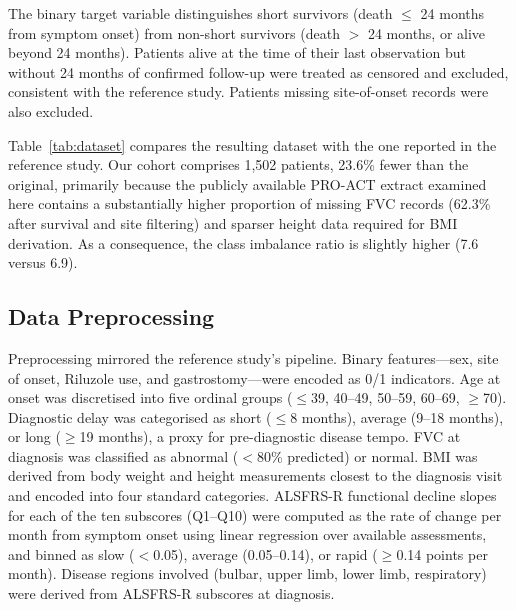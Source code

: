 \documentclass[a4paper,twoside]{article}
\begin{document}
The binary target variable distinguishes short survivors (death $\leq$ 24 months
from symptom onset) from non-short survivors (death $>$ 24 months, or alive
beyond 24 months). Patients alive at the time of their last observation but
without 24 months of confirmed follow-up were treated as censored and excluded,
consistent with the reference study. Patients missing site-of-onset records were
also excluded.

Table~\ref{tab:dataset} compares the resulting dataset with the one reported in
the reference study. Our cohort comprises 1,502 patients, 23.6\% fewer than the
original, primarily because the publicly available PRO-ACT extract examined
here contains a substantially higher proportion of missing FVC records (62.3\%
after survival and site filtering) and sparser height data required for BMI
derivation. As a consequence, the class imbalance ratio is slightly higher (7.6
versus 6.9).

\begin{table}[ht!]
  \centering
  \caption{Dataset comparison between the reference study~\protect\cite{Papaiz2024} and this work.}
  \label{tab:dataset}
\end{table}

\subsection{Data Preprocessing}

Preprocessing mirrored the reference study's pipeline. Binary features---sex,
site of onset, Riluzole use, and gastrostomy---were encoded as 0/1 indicators.
Age at onset was discretised into five ordinal groups ($\leq$39, 40--49, 50--59,
60--69, $\geq$70). Diagnostic delay was categorised as short ($\leq$8 months),
average (9--18 months), or long ($\geq$19 months), a proxy for pre-diagnostic
disease tempo. FVC at diagnosis was classified as abnormal ($<$80\% predicted) or
normal. BMI was derived from body weight and height measurements closest to the
diagnosis visit and encoded into four standard categories. ALSFRS-R functional
decline slopes for each of the ten subscores (Q1--Q10) were computed as the
rate of change per month from symptom onset using linear regression over
available assessments, and binned as slow ($<$0.05), average (0.05--0.14), or
rapid ($\geq$0.14 points per month). Disease regions involved
(bulbar, upper limb, lower limb, respiratory) were derived from ALSFRS-R
subscores at diagnosis.
\end{document}
